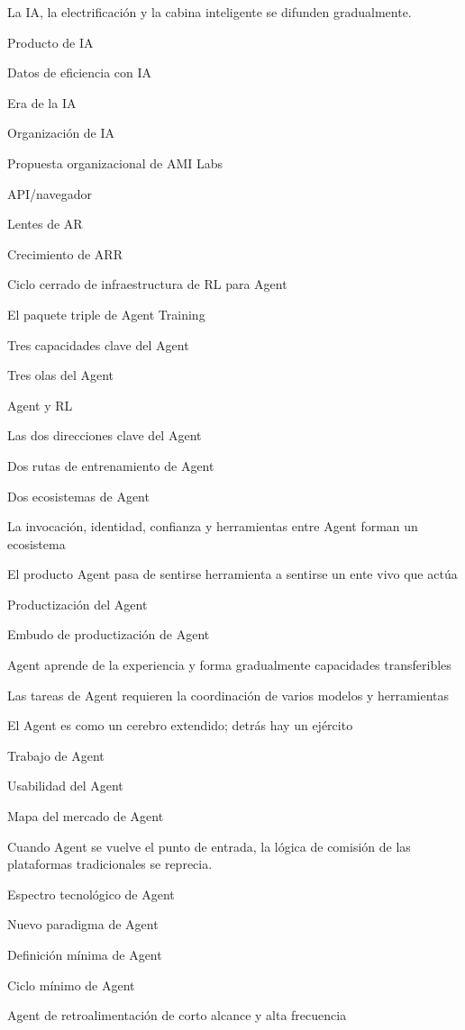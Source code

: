 \documentclass{article}
\begin{document}
La IA, la electrificación y la cabina inteligente se difunden gradualmente.

Producto de IA

Datos de eficiencia con IA

Era de la IA

Organización de IA

Propuesta organizacional de AMI Labs

API/navegador

Lentes de AR

Crecimiento de ARR

Ciclo cerrado de infraestructura de RL para Agent

El paquete triple de Agent Training

Tres capacidades clave del Agent

Tres olas del Agent

Agent y RL

Las dos direcciones clave del Agent

Dos rutas de entrenamiento de Agent

Dos ecosistemas de Agent

La invocación, identidad, confianza y herramientas entre Agent forman un ecosistema

El producto Agent pasa de sentirse herramienta a sentirse un ente vivo que actúa

Productización del Agent

Embudo de productización de Agent

Agent aprende de la experiencia y forma gradualmente capacidades transferibles

Las tareas de Agent requieren la coordinación de varios modelos y herramientas

El Agent es como un cerebro extendido; detrás hay un ejército

Trabajo de Agent

Usabilidad del Agent

Mapa del mercado de Agent

Cuando Agent se vuelve el punto de entrada, la lógica de comisión de las plataformas tradicionales se reprecia.

Espectro tecnológico de Agent

Nuevo paradigma de Agent

Definición mínima de Agent

Ciclo mínimo de Agent

Agent de retroalimentación de corto alcance y alta frecuencia
\end{document}
